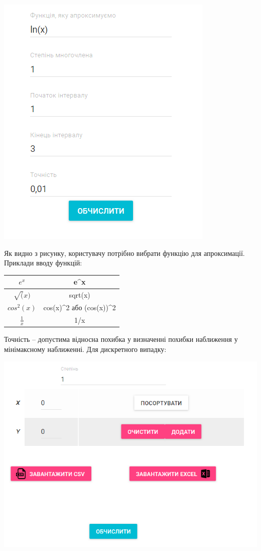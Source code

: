 \documentclass[ukrainian,14pt]{extarticle}
\begin{document}
\includegraphics[scale=1]{program_screenshots/form.png}


Як видно з рисунку, користувачу потрібно вибрати функцію для апроксимації. Приклади вводу функцій:

\bgroup
\def\arraystretch{1.5}%
\begin{center}
\begin{tabular}{ c | c }
 $e^x$ & e^x \\
 \hline
 $\sqrt(x)$ & sqrt(x) \\
 \hline
 $cos^2(x)$ & cos(x)^2 або (cos(x))^2 \\
 \hline
 $\frac{1}{x}$ & 1/x
\end{tabular}
\end{center}
\egroup

Точність – допустима відносна похибка у визначенні похибки наближення у мінімаксному наближенні.
Для дискретного випадку:

\includegraphics[scale=1]{program_screenshots/form_discrete.png}
\end{document}

